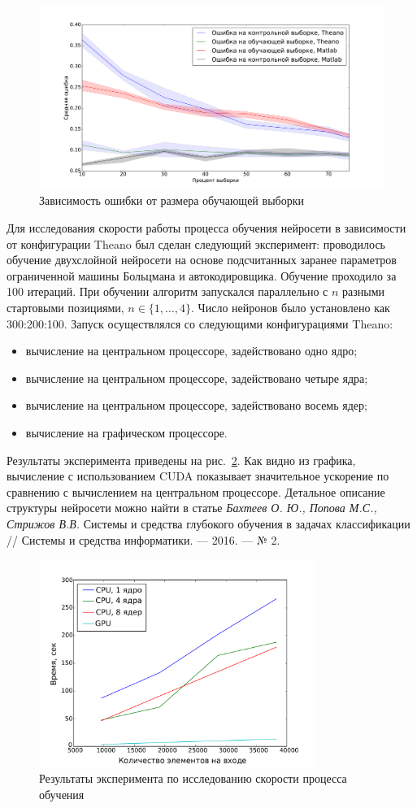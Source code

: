 \documentclass[12pt]{article}
\begin{document}
\begin{figure}[tb!]
 \centering
  \includegraphics[width=1.0\textwidth]{samples.pdf}
 \caption{Зависимость ошибки от размера обучающей выборки}
 \label{fig:samples}
\end{figure}


Для исследования скорости работы процесса обучения нейросети в зависимости от конфигурации Theano был сделан следующий эксперимент:
проводилось обучение двухслойной нейросети на основе подсчитанных заранее параметров ограниченной машины Больцмана и автокодировщика. Обучение проходило за 100 итераций. При обучении алгоритм запускался параллельно с $n$ разными стартовыми позициями, $n \in \{1,\dots,4\}.$ Число нейронов было установлено как 300:200:100.
Запуск осуществлялся со следующими конфигурациями Theano:
\begin{itemize}
\item вычисление на центральном процессоре, задействовано
одно ядро;
\item вычисление на центральном процессоре, задействовано четыре ядра;
\item вычисление на центральном процессоре, задействовано восемь ядер;
\item вычисление на графическом процессоре.
\end{itemize}

Результаты эксперимента приведены на рис.~\ref{fig:speed}. Как видно из графика, вычисление с использованием CUDA показывает значительное ускорение по сравнению с вычислением на центральном процессоре. Детальное описание структуры нейросети можно найти в статье \emph{Бахтеев О. Ю., Попова М.С., Стрижов В.В. } Системы и средства глубокого обучения в задачах классификации // Системы и средства информатики. — 2016. — № 2.


\begin{figure}[tb!]
 \centering
  \includegraphics[width=0.8\textwidth]{result.pdf}
 \caption{Результаты эксперимента по исследованию скорости процесса обучения}
 \label{fig:speed}
\end{figure}
\end{document}
